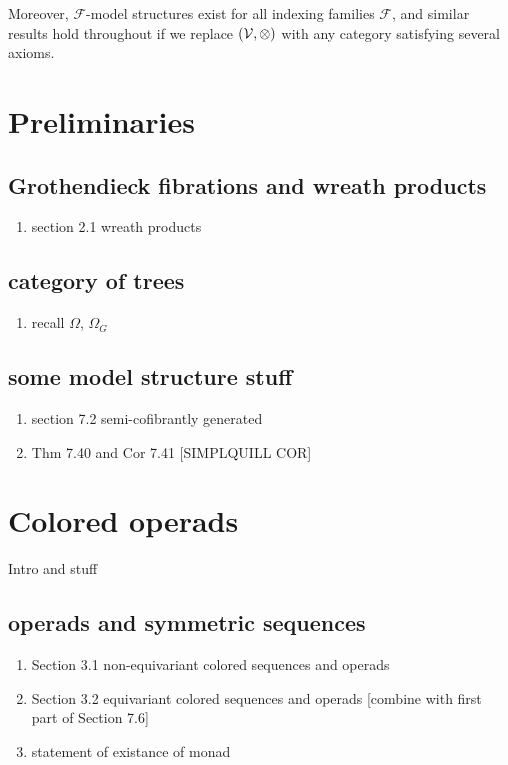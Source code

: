 \documentclass[a4paper,10pt
]{article}%
\renewcommand{\F}{\mathcal F}
\renewcommand{\1}{\ensuremath{\mathbb{id}}}
\begin{document}
Moreover, $\F$-model structures exist for all indexing families $\F$,
and similar results hold throughout if we replace $(\mathcal V, \otimes)$ with any category satisfying several axioms.


\section{Preliminaries}

\subsection{Grothendieck fibrations and wreath products}

\begin{enumerate}
\item section 2.1 wreath products
\end{enumerate}

\subsection{category of trees}

\begin{enumerate}
\item recall $\Omega$, $\Omega_G$
\end{enumerate}

\subsection{some model structure stuff}

\begin{enumerate}
\item section 7.2 semi-cofibrantly generated
\item Thm 7.40 and Cor 7.41 [SIMPLQUILL COR]      
\end{enumerate}

\section{Colored operads}

Intro and stuff

\subsection{operads and symmetric sequences}

\begin{enumerate}
\item Section 3.1 non-equivariant colored sequences and operads
\item Section 3.2 equivariant colored sequences and operads [combine with first part of Section 7.6]
\item statement of existance of monad
\end{enumerate}
\end{document}
